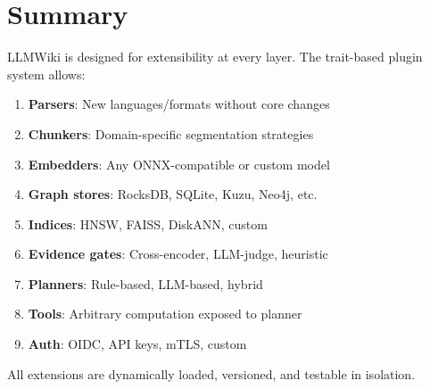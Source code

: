 \section{Summary}
\label{sec:dev-guide:summary}

LLMWiki is designed for extensibility at every layer. The trait-based plugin system allows:
\begin{enumerate}
  \item \textbf{Parsers}: New languages/formats without core changes
  \item \textbf{Chunkers}: Domain-specific segmentation strategies
  \item \textbf{Embedders}: Any ONNX-compatible or custom model
  \item \textbf{Graph stores}: RocksDB, SQLite, Kuzu, Neo4j, etc.
  \item \textbf{Indices}: HNSW, FAISS, DiskANN, custom
  \item \textbf{Evidence gates}: Cross-encoder, LLM-judge, heuristic
  \item \textbf{Planners}: Rule-based, LLM-based, hybrid
  \item \textbf{Tools}: Arbitrary computation exposed to planner
  \item \textbf{Auth}: OIDC, API keys, mTLS, custom
\end{enumerate}
All extensions are dynamically loaded, versioned, and testable in isolation.

